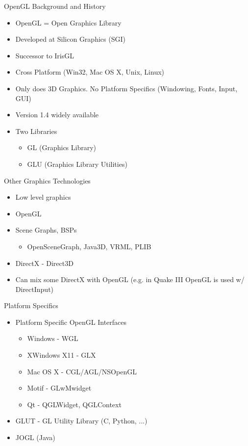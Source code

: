 \documentclass[aspectratio=1610,xcolor=dvipsnames,t]{beamer}
\begin{document}
\begin{frame}{OpenGL Background and History} 
    \begin{itemize}
        \item OpenGL = Open Graphics Library
        \item Developed at Silicon Graphics (SGI)
        \item Successor to IrisGL
        \item Cross Platform (Win32, Mac OS X, Unix, Linux)
        \item Only does 3D Graphics. No Platform Specifics (Windowing, Fonts, Input, GUI)
        \item Version 1.4 widely available
        \item Two Libraries
        \begin{itemize}
            \item GL (Graphics Library)
            \item GLU (Graphics Library Utilities)
        \end{itemize} 
    \end{itemize} 
\end{frame} 

\begin{frame}{Other Graphics Technologies} 
    \begin{itemize}
        \item Low level graphics
        \item OpenGL
        \item Scene Graphs, BSPs
            \begin{itemize}
                \item OpenSceneGraph, Java3D, VRML, PLIB
            \end{itemize} 
        \item DirectX - Direct3D
        \item Can mix some DirectX with OpenGL (e.g. in Quake III OpenGL is used w/ DirectInput)
    \end{itemize} 
\end{frame} 

\begin{frame}{Platform Specifics}
    \begin{itemize}
        \item Platform Specific OpenGL Interfaces
            \begin{itemize} 
                \item Windows - WGL
                \item XWindows X11 - GLX
                \item Mac OS X - CGL/AGL/NSOpenGL
                \item Motif - GLwMwidget
                \item Qt - QGLWidget, QGLContext
            \end{itemize} 
        \item GLUT - GL Utility Library (C, Python, ...)
        \item JOGL (Java)
    \end{itemize} 
\end{frame} 
\end{document}

